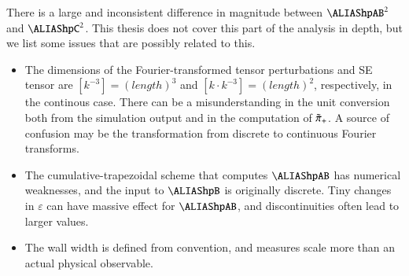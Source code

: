     There is a large and inconsistent difference in magnitude between $\hpAB^2$ and $\hpC^2$. This thesis does not cover this part of the analysis in depth, but we list some issues that are possibly related to this.
    \begin{itemize}
        \item The dimensions of the Fourier-transformed tensor perturbations and SE tensor are $[k^{-3}] = \unit{(length)}^{3}$ and $[k \cdot k^{-3}]=\unit{(length)}^{2}$, respectively, in the continous case. There can be a misunderstanding in the unit conversion both from the simulation output and in the computation of $\tilde{\pi}_+$. 
        A source of confusion may be the transformation from discrete to continuous Fourier transforms. 
        \item The cumulative-trapezoidal scheme that computes $\hpAB$ has numerical weaknesses, and the input to $\hpB$ is originally discrete. Tiny changes in $\varepsilon$ can have massive effect for $\hpAB$, and discontinuities often lead to larger values.
        \item The wall width is defined from convention, and measures scale more than an actual physical observable. 
    \end{itemize}
